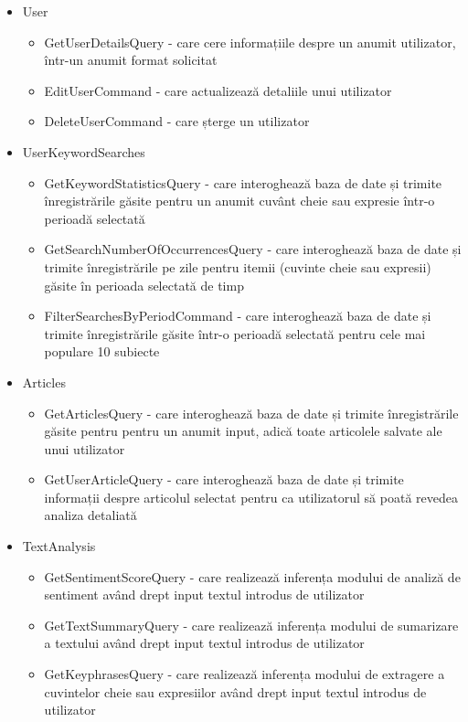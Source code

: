 \begin{itemize}
	\setlength\itemsep{0.5em}
	\item User
	\begin{itemize}
		\setlength\itemsep{0.5em}
		\item GetUserDetailsQuery - care cere informațiile despre un anumit utilizator, într-un anumit format solicitat
		\item EditUserCommand - care actualizează detaliile unui utilizator
		\item DeleteUserCommand - care șterge un utilizator
	\end{itemize}
	\item UserKeywordSearches
	\begin{itemize}
		\setlength\itemsep{0.5em}
		\item GetKeywordStatisticsQuery - care interoghează baza de date și trimite înregistrările găsite pentru un anumit cuvânt cheie sau expresie într-o perioadă selectată
		\item GetSearchNumberOfOccurrencesQuery - care interoghează baza de date și trimite înregistrările pe zile pentru itemii (cuvinte cheie sau expresii) găsite în perioada selectată de timp
		\item FilterSearchesByPeriodCommand - care interoghează baza de date și trimite înregistrările găsite într-o perioadă selectată pentru cele mai populare 10 subiecte
	\end{itemize}
	\item Articles
	\begin{itemize}
		\setlength\itemsep{0.5em}
		\item GetArticlesQuery - care interoghează baza de date și trimite înregistrările găsite pentru pentru un anumit input, adică toate articolele salvate ale unui utilizator
		\item GetUserArticleQuery - care interoghează baza de date și trimite informații despre articolul selectat pentru ca utilizatorul să poată revedea analiza detaliată
	\end{itemize}
	\item TextAnalysis
	\begin{itemize}
		\setlength\itemsep{0.5em}
		\item GetSentimentScoreQuery - care realizează inferența modului de analiză de sentiment având drept input textul introdus de utilizator
		\item GetTextSummaryQuery -  care realizează inferența modului de sumarizare a textului având drept input textul introdus de utilizator
		\item GetKeyphrasesQuery - care realizează inferența modului de extragere a cuvintelor cheie sau expresiilor având drept input textul introdus de utilizator
	\end{itemize}
\end{itemize}
